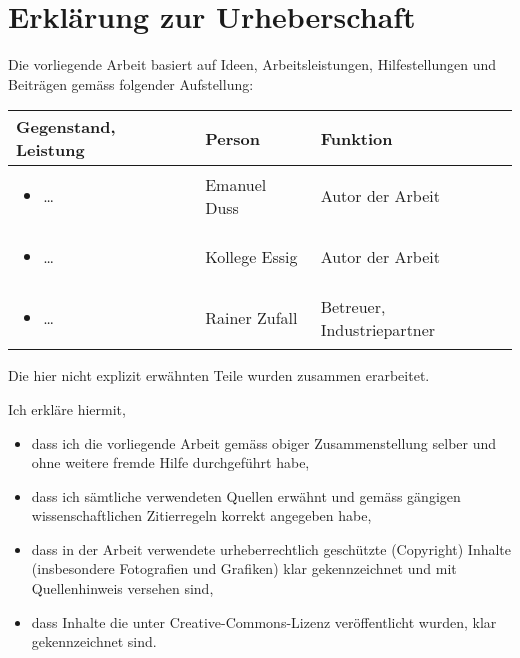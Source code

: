 \chapter{Erklärung zur Urheberschaft}

Die vorliegende Arbeit basiert auf Ideen, Arbeitsleistungen, Hilfestellungen
und Beiträgen gemäss folgender Aufstellung:

\begin{tabular}[l]{| p{8cm} | l | l |}
\hline
\textbf{Gegenstand, Leistung} & \textbf{Person} & \textbf{Funktion} \\ \hline \hline
\begin{itemize}
  \item \ldots
\end{itemize}
  & Emanuel Duss
  & Autor der Arbeit \\ \hline
\begin{itemize}
  \item \ldots
\end{itemize}
  & Kollege Essig
  & Autor der Arbeit \\ \hline
\begin{itemize}
  \item \ldots
\end{itemize}
  & Rainer Zufall
  & Betreuer, Industriepartner \\ \hline
\end{tabular}

Die hier nicht explizit erwähnten Teile wurden zusammen erarbeitet.

Ich erkläre hiermit,

\begin{itemize}
  \item dass ich die vorliegende Arbeit gemäss obiger Zusammenstellung selber
    und ohne weitere fremde Hilfe durchgeführt habe,
  \item dass ich sämtliche verwendeten Quellen erwähnt und gemäss gängigen
    wissenschaftlichen Zitierregeln korrekt angegeben habe,
  \item dass in der Arbeit verwendete urheberrechtlich geschützte (Copyright)
    Inhalte (insbesondere Fotografien und Grafiken) klar gekennzeichnet und mit
    Quellenhinweis versehen sind,
  \item dass Inhalte die unter Creative-Commons-Lizenz veröffentlicht wurden,
    klar gekennzeichnet sind.
\end{itemize} 


